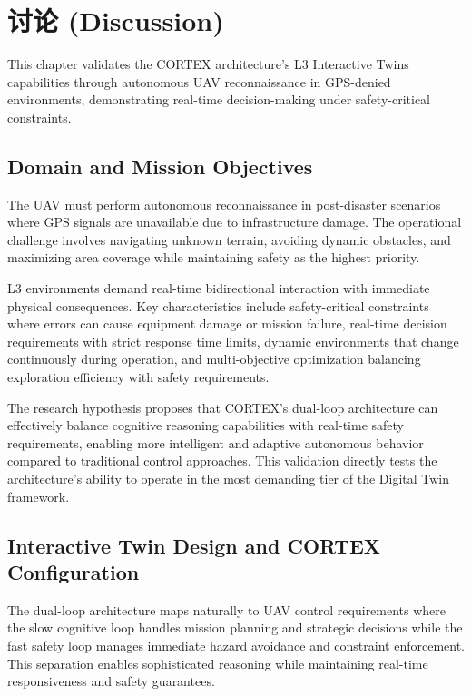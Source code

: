 
\chapter{讨论 (Discussion)} \label{chp:discussion}

This chapter validates the CORTEX architecture's L3 Interactive Twins capabilities through autonomous UAV reconnaissance in GPS-denied environments, demonstrating real-time decision-making under safety-critical constraints.

\section{Domain and Mission Objectives}

The UAV must perform autonomous reconnaissance in post-disaster scenarios where GPS signals are unavailable due to infrastructure damage. The operational challenge involves navigating unknown terrain, avoiding dynamic obstacles, and maximizing area coverage while maintaining safety as the highest priority.

L3 environments demand real-time bidirectional interaction with immediate physical consequences. Key characteristics include safety-critical constraints where errors can cause equipment damage or mission failure, real-time decision requirements with strict response time limits, dynamic environments that change continuously during operation, and multi-objective optimization balancing exploration efficiency with safety requirements.

The research hypothesis proposes that CORTEX's dual-loop architecture can effectively balance cognitive reasoning capabilities with real-time safety requirements, enabling more intelligent and adaptive autonomous behavior compared to traditional control approaches. This validation directly tests the architecture's ability to operate in the most demanding tier of the Digital Twin framework.

\section{Interactive Twin Design and CORTEX Configuration}

The dual-loop architecture maps naturally to UAV control requirements where the slow cognitive loop handles mission planning and strategic decisions while the fast safety loop manages immediate hazard avoidance and constraint enforcement. This separation enables sophisticated reasoning while maintaining real-time responsiveness and safety guarantees.

